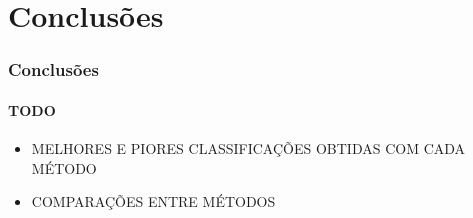 \documentclass{beamer}
\begin{document}
	\section[Conclusões]{Conclusões}

		\begin{frame}
		\frametitle{Conclusões}
		\framesubtitle{TODO}
		\begin{itemize}
		\item MELHORES E PIORES CLASSIFICAÇÕES OBTIDAS COM CADA MÉTODO
		\item COMPARAÇÕES ENTRE MÉTODOS
		\end{itemize}
		\end{frame}
\end{document}
